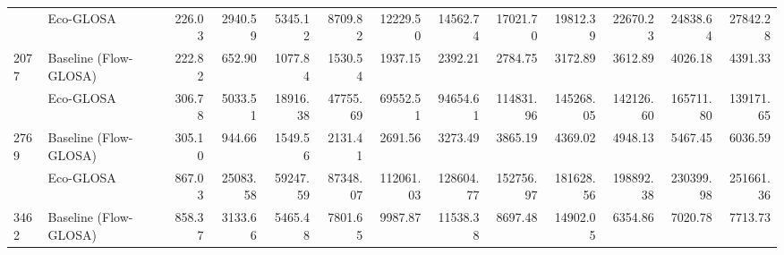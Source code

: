 \begin{table}[ht]
{\begin{tabular}{llrrrrrrrrrrr}
        \addlinespace
        2077 & Eco-GLOSA                    &  226.03 & 2940.59 & 5345.12 & 8709.82 &12229.50 &14562.74 &17021.70 &19812.39 &22670.23 &24838.64 &27842.28 \\
        2077 & Baseline (Flow-GLOSA)        &  222.82 &  652.90 & 1077.84 & 1530.54 & 1937.15 & 2392.21 & 2784.75 & 3172.89 & 3612.89 & 4026.18 & 4391.33 \\
        \addlinespace
        2769 & Eco-GLOSA                    &  306.78 & 5033.51 &18916.38 &47755.69 &69552.51 &94654.61 &114831.96&145268.05&142126.60&165711.80&139171.65 \\
        2769 & Baseline (Flow-GLOSA)        &  305.10 &  944.66 & 1549.56 & 2131.41 & 2691.56 & 3273.49 & 3865.19 & 4369.02 & 4948.13 & 5467.45 & 6036.59 \\
        \addlinespace
        3462 & Eco-GLOSA                    &  867.03 &25083.58 &59247.59 &87348.07 &112061.03&128604.77&152756.97&181628.56&198892.38&230399.98&251661.36 \\
        3462 & Baseline (Flow-GLOSA)        &  858.37 & 3133.66 & 5465.48 & 7801.65 & 9987.87 &11538.38 & 8697.48 &14902.05 & 6354.86 & 7020.78 & 7713.73 \\
        \bottomrule
      \end{tabular}
    }
\end{table}

